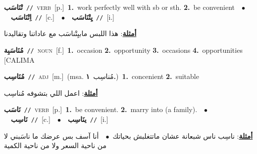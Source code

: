 \documentclass[10pt,a4paper,twoside]{article} %
\begin{document}
\begin{multicols}{2}
{\setlength\topsep{0pt}\textbf{\foreignlanguage{arabic}{تْنَاسَب}}\ {\color{gray}\texttt{//}\color{black}}\ \textsc{verb}\ [p.]\ \textbf{1.}~work perfectly well with sb or sth.  \textbf{2.}~be convenient\ \ $\bullet$\ \ \setlength\topsep{0pt}\textbf{\foreignlanguage{arabic}{اِتْنَاسَب}}\ {\color{gray}\texttt{//}\color{black}}\ [c.]\ \ $\bullet$\ \ \setlength\topsep{0pt}\textbf{\foreignlanguage{arabic}{يِتْنَاسَب}}\ {\color{gray}\texttt{//}\color{black}}\ [i.]\  \begin{flushright}\color{gray}\foreignlanguage{arabic}{\textbf{\underline{\foreignlanguage{arabic}{أمثلة}}}: هذا اللبس مابيِتْناسَب مع عاداتنا وتقاليدنا}\end{flushright}\color{black}} \vspace{2mm}

{\setlength\topsep{0pt}\textbf{\foreignlanguage{arabic}{مُنَاسَبِة}}\ {\color{gray}\texttt{//}\color{black}}\ \textsc{noun}\ [f.]\ \textbf{1.}~occasion  \textbf{2.}~opportunity  \textbf{3.}~occasions  \textbf{4.}~opportunities [CALIMA\ } \vspace{2mm}

{\setlength\topsep{0pt}\textbf{\foreignlanguage{arabic}{مُنَاسِب}}\ {\color{gray}\texttt{//}\color{black}}\ \textsc{adj}\ [m.]\ \color{gray}(msa. \foreignlanguage{arabic}{مُناسِب}~\foreignlanguage{arabic}{\textbf{١.}})\color{black}\ \textbf{1.}~concenient  \textbf{2.}~suitable\  \begin{flushright}\color{gray}\foreignlanguage{arabic}{\textbf{\underline{\foreignlanguage{arabic}{أمثلة}}}: اعمل اللي بتشوفه مُناسِب}\end{flushright}\color{black}} \vspace{2mm}

{\setlength\topsep{0pt}\textbf{\foreignlanguage{arabic}{نَاسَب}}\ {\color{gray}\texttt{//}\color{black}}\ \textsc{verb}\ [p.]\ \textbf{1.}~be convenient.  \textbf{2.}~marry into (a family).\ \ $\bullet$\ \ \setlength\topsep{0pt}\textbf{\foreignlanguage{arabic}{نَاسِب}}\ {\color{gray}\texttt{//}\color{black}}\ [c.]\ \ $\bullet$\ \ \setlength\topsep{0pt}\textbf{\foreignlanguage{arabic}{ينَاسِب}}\ {\color{gray}\texttt{//}\color{black}}\ [i.]\  \begin{flushright}\color{gray}\foreignlanguage{arabic}{\textbf{\underline{\foreignlanguage{arabic}{أمثلة}}}: ناسِب ناس شبعانة عشان ماتتغلبش بحياتك\ $\bullet$\ \  أنا آسف بس عرضك ما ناسَبني لا من ناحية السعر ولا من ناحية الكمية}\end{flushright}\color{black}} \vspace{2mm}


\end{multicols}
\end{document}
